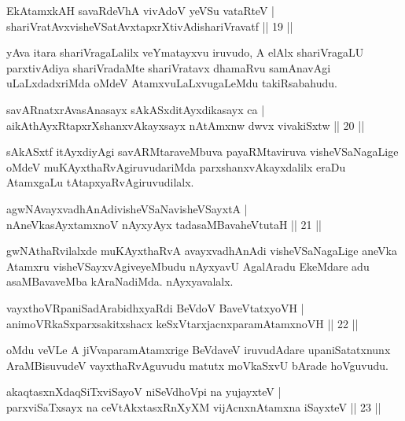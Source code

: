 \begin{shl}
EkAtamxkAH savaRdeVhA vivAdoV yeVSu vataRteV |\\
shariVratAvxvisheVSatAvxtapxrXtivAdishariVravatf \hfill || 19 ||
\end{shl}

\begin{artha}
yAva itara shariVragaLalilx veYmatayxvu iruvudo, A elAlx shariVragaLU parxtivAdiya shariVradaMte shariVratavx dhamaRvu samAnavAgi uLaLxdadxriMda oMdeV AtamxvuLaLxvugaLeMdu takiRsabahudu.
\end{artha}

\begin{shl}
savARnatxrAvasAnasayx sAkASxditAyxdikasayx ca |\\
aikAthAyxRtapxrXshanxvAkayxsayx nA\s \s tAmxnw dwvx vivakiSxtw \hfill || 20 ||
\end{shl}

\begin{artha}
sAkASxtf itAyxdiyAgi savARMtaraveMbuva payaRMtaviruva visheVSaNagaLige oMdeV muKAyxthaRvAgiruvudariMda parxshanxvAkayxdalilx eraDu AtamxgaLu tAtapxyaRvAgiruvudilalx.
\end{artha}

\begin{shl}
agwNAvayxvadhAnAdivisheVSaNavisheVSayxtA |\\
nAneVkasAyx\s \s tamxnoV nAyxyAyx tadasaMBavaheVtutaH \hfill || 21 ||
\end{shl}

\begin{artha}%
gwNAthaRvilalxde muKAyxthaRvA avayxvadhAnAdi visheVSaNagaLige aneVka Atamxru visheVSayxvAgiveyeMbudu nAyxyavU AgalAradu EkeMdare adu asaMBavaveMba kAraNadiMda. nAyxyavalalx.
\end{artha}

\begin{shl}
vayxthoVRpaniSadArabidhxyaRdi BeVdoV BaveVtatxyoVH |\\
animoVRkaSxparxsakitxshacx keSxVtarxjacnxparamAtamxnoVH \hfill || 22 ||
\end{shl}

\begin{artha}
oMdu veVLe A jiVvaparamAtamxrige BeVdaveV iruvudAdare upaniSatatxnunx AraMBisuvudeV vayxthaRvAguvudu matutx moVkaSxvU bArade hoVguvudu. 
\end{artha}

\begin{shl}
akaqtasxnXdaqSiTxviSayoV niSeVdhoV\s pi na yujayxteV |\\
parxviSaTxsayx na ceVtAkxtasxRnXyXM vijAcnxnAtamxna iSayxteV \hfill || 23 ||
\end{shl}

